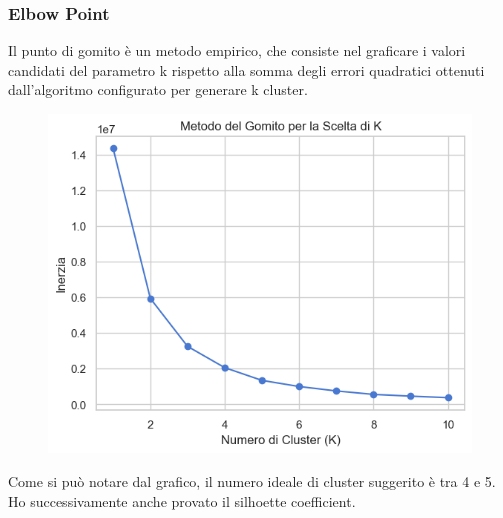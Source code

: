\documentclass[]{article}
\begin{document}
            \subsubsection{Elbow Point}
                Il punto di gomito è un metodo empirico, che consiste nel graficare i valori candidati del parametro k rispetto alla somma degli errori quadratici ottenuti dall’algoritmo configurato per generare k cluster.
                \begin{figure}[H]
                    \centering
                    \includegraphics[width=0.7\linewidth]{images/elbowPoint.png}
                    \label{fig:enter-label}
                \end{figure}
                Come si può notare dal grafico, il numero ideale di cluster suggerito è tra 4 e 5. Ho successivamente anche provato il silhoette coefficient.
\end{document}
